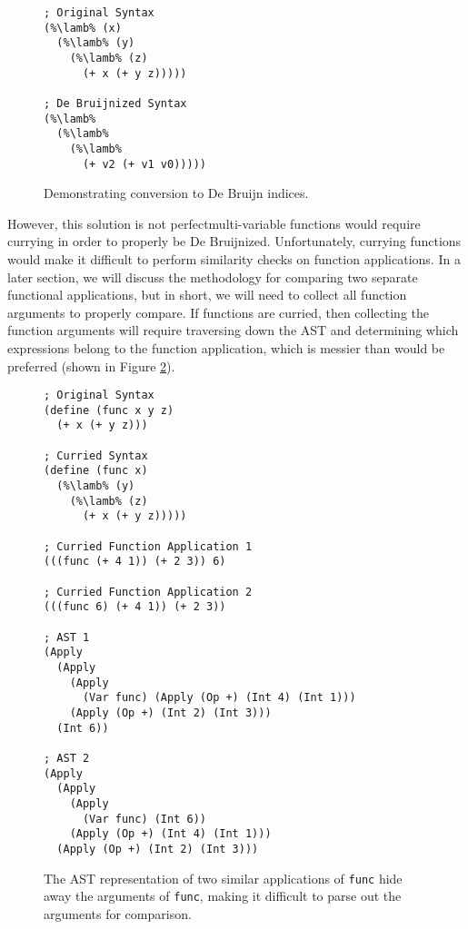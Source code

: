 \documentclass[12pt]{article}
\newcommand{\key}[1]{\texttt{#1}}
\newcommand{\lamb}[0]{\key{$\lambda$}}
\begin{document}
\begin{figure}[H]
  \begin{mdframed}
    \begin{lstlisting}[escapechar=\%]
; Original Syntax
(%\lamb% (x)
  (%\lamb% (y)
    (%\lamb% (z)
      (+ x (+ y z)))))

; De Bruijnized Syntax
(%\lamb%
  (%\lamb% 
    (%\lamb% 
      (+ v2 (+ v1 v0)))))
    \end{lstlisting}
  \end{mdframed}
  \caption{Demonstrating conversion to De Bruijn indices.}
  \label{fig:f3}
\end{figure}

However, this solution is not perfect\textemdash multi-variable functions would require currying in order to properly be De Bruijnized. Unfortunately, currying functions would make it difficult to perform similarity checks on function applications. In a later section, we will discuss the methodology for comparing two separate functional applications, but in short, we will need to collect all function arguments to properly compare. If functions are curried, then collecting the function arguments will require traversing down the AST and determining which expressions belong to the function application, which is messier than would be preferred (shown in Figure \ref{fig:f4}).

\hfill

\begin{figure}[H]
  \begin{mdframed}
    \begin{lstlisting}[escapechar=\%]
; Original Syntax
(define (func x y z)
  (+ x (+ y z)))

; Curried Syntax
(define (func x)
  (%\lamb% (y)
    (%\lamb% (z)
      (+ x (+ y z)))))

; Curried Function Application 1
(((func (+ 4 1)) (+ 2 3)) 6)

; Curried Function Application 2
(((func 6) (+ 4 1)) (+ 2 3))

; AST 1
(Apply
  (Apply
    (Apply
      (Var func) (Apply (Op +) (Int 4) (Int 1)))
    (Apply (Op +) (Int 2) (Int 3)))
  (Int 6))

; AST 2
(Apply
  (Apply
    (Apply
      (Var func) (Int 6))
    (Apply (Op +) (Int 4) (Int 1)))
  (Apply (Op +) (Int 2) (Int 3)))
    \end{lstlisting}
  \end{mdframed}
  \caption{The AST representation of two similar applications of \key{func} hide away the arguments of \key{func}, making it difficult to parse out the arguments for comparison.}
  \label{fig:f4}
\end{figure}
\end{document}
